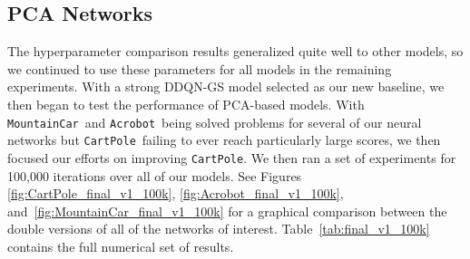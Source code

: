 \documentclass[11pt]{article}
\newcommand{\cp}{\texttt{CartPole}}
\newcommand{\ab}{\texttt{Acrobot}}
\newcommand{\mc}{\texttt{MountainCar}}
\begin{document}
\subsection{PCA Networks}

The hyperparameter comparison results generalized quite well to other models, so we continued to use these parameters for all models in the remaining experiments. With a strong DDQN-GS model selected as our new baseline, we then began to test the performance of PCA-based models. With \mc~and \ab~being solved problems for several of our neural networks but \cp~failing to ever reach particularly large scores, we then focused our efforts on improving \cp. We then ran a set of experiments for 100,000 iterations over all of our models. See Figures \ref{fig:CartPole_final_v1_100k}, \ref{fig:Acrobot_final_v1_100k}, and~\ref{fig:MountainCar_final_v1_100k} for a graphical comparison between the double versions of all of the networks of interest. Table~\ref{tab:final_v1_100k} contains the full numerical set of results. 
\end{document}
